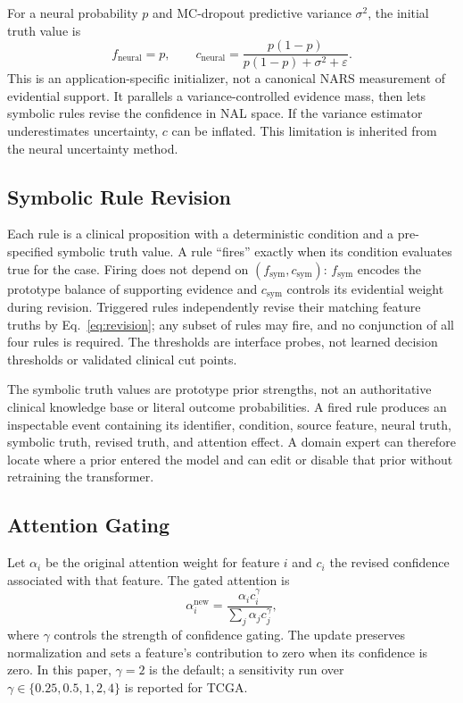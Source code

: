 \documentclass[final]{nesy2026}
\begin{document}
For a neural probability $p$ and MC-dropout predictive variance $\sigma^2$, the initial truth value is
\begin{equation}
f_{\text{neural}}=p,\qquad
c_{\text{neural}}=\frac{p(1-p)}{p(1-p)+\sigma^2+\varepsilon}.
\label{eq:neural_to_nars}
\end{equation}
This is an application-specific initializer, not a canonical NARS measurement of evidential support. It parallels a variance-controlled evidence mass, then lets symbolic rules revise the confidence in NAL space. If the variance estimator underestimates uncertainty, $c$ can be inflated. This limitation is inherited from the neural uncertainty method.

\subsection{Symbolic Rule Revision}

Each rule is a clinical proposition with a deterministic condition and a pre-specified symbolic truth value. A rule ``fires'' exactly when its condition evaluates true for the case. Firing does not depend on $(f_{\mathrm{sym}},c_{\mathrm{sym}})$: $f_{\mathrm{sym}}$ encodes the prototype balance of supporting evidence and $c_{\mathrm{sym}}$ controls its evidential weight during revision. Triggered rules independently revise their matching feature truths by Eq.~\eqref{eq:revision}; any subset of rules may fire, and no conjunction of all four rules is required. The thresholds are interface probes, not learned decision thresholds or validated clinical cut points.

The symbolic truth values are prototype prior strengths, not an authoritative clinical knowledge base or literal outcome probabilities. A fired rule produces an inspectable event containing its identifier, condition, source feature, neural truth, symbolic truth, revised truth, and attention effect. A domain expert can therefore locate where a prior entered the model and can edit or disable that prior without retraining the transformer.

\subsection{Attention Gating}

Let $\alpha_i$ be the original attention weight for feature $i$ and $c_i$ the revised confidence associated with that feature. The gated attention is
\begin{equation}
\alpha_i^{\text{new}}=
\frac{\alpha_i c_i^\gamma}{\sum_j \alpha_j c_j^\gamma},
\label{eq:attention_update}
\end{equation}
where $\gamma$ controls the strength of confidence gating. The update preserves normalization and sets a feature's contribution to zero when its confidence is zero. In this paper, $\gamma=2$ is the default; a sensitivity run over $\gamma\in\{0.25,0.5,1,2,4\}$ is reported for TCGA.
\end{document}
